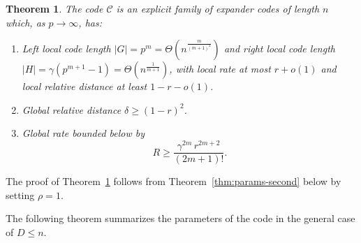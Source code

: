 \documentclass[11pt]{article}
\theoremstyle{plain}
\newtheorem{theorem}{Theorem}[section]
\theoremstyle{definition}
\begin{document}
\begin{theorem}
\label{thm:params-second2}
The code $\mathcal{C}$ is an explicit family of expander codes of length $n$ which, as $p \to \infty$, has:
\begin{enumerate}
    \item Left local code length $|G|=p^m = \Theta(n^{\frac{m}{(m+1)^2}})$ and right local code length $|H|=\gamma (p^{m+1}-1) = \Theta(n^{\frac{1}{m+1}})$, with local rate at most $r+o(1)$ and local relative distance at least $1-r-o(1)$.
    \item Global relative distance $\delta \ge (1-r)^2$.
    \item Global rate bounded below by \[ R\ge \frac{\gamma^{2m}\, r^{2m+2}}{(2m+1)!}. \]
\end{enumerate}
\end{theorem}

The proof of Theorem~\ref{thm:params-second2} follows from Theorem~\ref{thm:params-second} below by setting $\rho=1$.

The following theorem summarizes the parameters of the code in the general case of $D\leq n$. 
\end{document}
